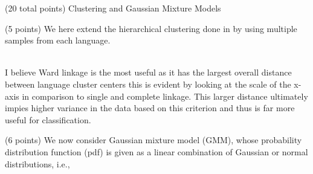 \documentclass[12pt]{article}
\begin{document}
\begin{question}{(20 total points) Clustering and Gaussian Mixture Models}
\begin{subquestion}{(5 points)
       We here extend the hierarchical clustering done in  by
       using multiple samples from each language.
     }
\begin{answerbox}{50em}
{\\
        I believe Ward linkage is the most useful as it has the largest overall distance between language cluster centers this is evident by looking at the scale of the x-axis in comparison to single and complete linkage. This larger distance ultimately impies higher variance in the data based on this criterion and thus is far more useful for classification.
        } 
      \end{answerbox}
  


   \end{subquestion}
   \begin{subquestion}{(6 points)
       We now consider Gaussian mixture model (GMM), whose
       probability distribution function (pdf) is given as
       a linear combination of Gaussian or normal distributions, i.e.,
     } \label{Q3.5}





\end{subquestion}
\end{question}
\end{document}
